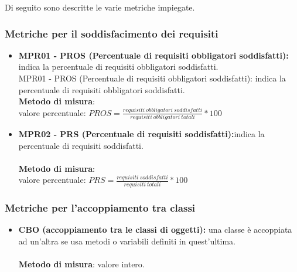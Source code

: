 Di seguito sono descritte le varie metriche impiegate.

\subsubsection{Metriche per il soddisfacimento dei requisiti}
\begin{itemize}
    \item \textbf{MPR01 - PROS (Percentuale di requisiti obbligatori soddisfatti):} indica la percentuale di requisiti obbligatori soddisfatti.\\
    MPR01 - PROS (Percentuale di requisiti obbligatori soddisfatti): indica la percentuale di requisiti obbligatori soddisfatti.
    \\\textbf{Metodo di misura}:\\valore percentuale: $PROS = \frac{requisiti \ obbligatori \ soddisfatti}{requisiti \ obbligatori \ totali} * 100$
    \item \textbf{MPR02 - PRS (Percentuale di requisiti soddisfatti):}indica la percentuale di requisiti soddisfatti.\\
    \\\textbf{Metodo di misura}:\\valore percentuale: $PRS = \frac{requisiti \ soddisfatti}{requisiti \ totali} * 100$
\end{itemize}

\subsubsection{Metriche per l'accoppiamento tra classi}
\begin{itemize}
    \item \textbf{CBO (accoppiamento tra le classi di oggetti):} una classe è accoppiata ad un'altra se usa metodi o variabili definiti in quest'ultima.\\
    \\\textbf{Metodo di misura}: valore intero.
\end{itemize}


